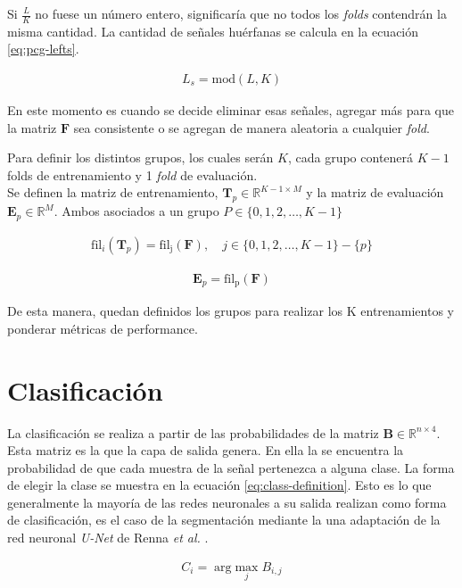 \indent Si $\frac{L}{K}$ no fuese un número entero, significaría que no todos los \textit{folds} contendrán la misma cantidad. La cantidad de señales huérfanas se calcula en la ecuación \ref{eq:pcg-lefts}.

\begin{align} \label{eq:pcg-lefts}
    L_{s} = \mathrm{mod}(L,K)
\end{align}

\indent En este momento es cuando se decide eliminar esas señales, agregar más para que la matriz $\mathbf{F}$ sea consistente o se agregan de manera aleatoria a cualquier \textit{fold}.

Para definir los distintos grupos, los cuales serán $K$, cada grupo contenerá $K-1$ folds de entrenamiento y 1 \textit{fold} de evaluación. \\
\indent Se definen la matriz de entrenamiento, $\bm{T}_p \in \mathbb{R}^{K-1 \times M}$ y la matriz de evaluación $\mathbf{E}_p \in \mathbb{R}^M$. Ambos asociados a un grupo $P \in \{0,1,2,\dots,K-1\}$

\begin{align}
    \mathrm{fil}_i(\bm{T}_p) = \mathrm{fil_j(\bm{F})}, \quad j \in \{0,1,2,\dots,K-1\}-\{p\}
\end{align}

\begin{align}
    \bm{E}_{p} = \mathrm{fil_p}(\bm{F})
\end{align}

\indent De esta manera, quedan definidos los grupos para realizar los K entrenamientos y ponderar métricas de performance.

\section{Clasificación}

\indent La clasificación se realiza a partir de las probabilidades de la matriz $\bm{B} \in \mathbb{R}^{n \times 4}$. Esta matriz es la que la capa de salida genera. En ella la se encuentra la probabilidad de que cada muestra de la señal pertenezca a alguna clase. La forma de elegir la clase se muestra en la ecuación \ref{eq:class-definition}. Esto es lo que generalmente la mayoría de las redes neuronales a su salida realizan como forma de clasificación, es el caso de la segmentación mediante la una adaptación de la red neuronal \textit{U-Net} de Renna \textit{et al.} \cite{pp:renna2018}.

\begin{align} \label{eq:class-definition}
    C_i = \arg \underset{j}{\mathrm{max}} \; B_{i,j}
\end{align}


